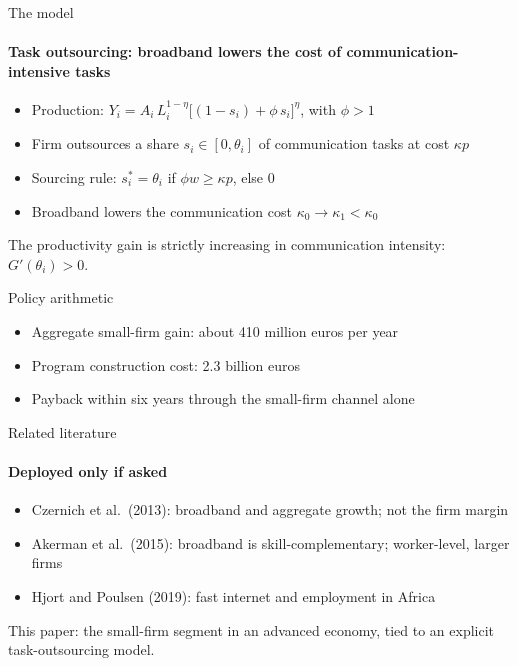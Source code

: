 \documentclass[11pt, aspectratio=169]{beamer}
\begin{document}
\begin{frame}{The model}
  \hypertarget{app:model}{}%
  \framesubtitle{Task outsourcing: broadband lowers the cost of communication-intensive tasks}
  \medskip
  \begin{itemize}\setlength{\itemsep}{0.5em}
    \item Production: $Y_i = A_i\,L_i^{1-\eta}\big[(1-s_i)+\phi\,s_i\big]^{\eta}$, with $\phi>1$  %
    \item Firm outsources a share $s_i\in[0,\theta_i]$ of communication tasks at cost $\kappa p$
    \item Sourcing rule: $s_i^\ast=\theta_i$ if $\phi w \geq \kappa p$, else $0$  %
    \item Broadband lowers the communication cost $\kappa_0 \to \kappa_1 < \kappa_0$
  \end{itemize}
  \medskip
  \begin{ResultBox}[Proposition 1]
    The productivity gain is strictly increasing in communication intensity: $G'(\theta_i)>0$.  %
  \end{ResultBox}
\end{frame}

\begin{frame}[t]{Policy arithmetic}
  \hypertarget{app:policy}{}%
  \medskip
  \begin{itemize}\setlength{\itemsep}{0.7em}
    \item Aggregate small-firm gain: about 410 million euros per year   %
    \item Program construction cost: 2.3 billion euros   %
    \vspace*{-0.5em}
    \item[$\Rightarrow$] Payback within six years through the small-firm channel alone
  \end{itemize}
\end{frame}

\begin{frame}{Related literature}
  \framesubtitle{Deployed only if asked}
  \medskip
  \begin{itemize}\setlength{\itemsep}{0.6em}
    \item Czernich et al.\ (2013): broadband and aggregate growth; not the firm margin
    \item Akerman et al.\ (2015): broadband is skill-complementary; worker-level, larger firms
    \item Hjort and Poulsen (2019): fast internet and employment in Africa
  \end{itemize}
  \medskip
  This paper: the small-firm segment in an advanced economy, tied to an explicit task-outsourcing model.
\end{frame}
\end{document}
